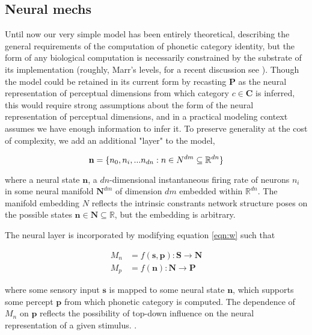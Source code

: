 
\subsection{Neural mechs}

Until now our very simple model has been entirely theoretical, describing the general requirements of the computation of phonetic category identity, but the form of any biological computation is necessarily constrained by the substrate of its implementation (roughly, Marr's levels, for a recent discussion see \cite{rooijTheoryTestHow2020}). Though the model could be retained in its current form by recasting $\mathbf{P}$ as the neural representation of perceptual dimensions from which category $c \in \mathbf{C}$ is inferred, this would require strong assumptions about the form of the neural representation of perceptual dimensions, and in a practical modeling context assumes we have enough information to infer it. To preserve generality at the cost of complexity, we add an additional "layer" to the model, 

\begin{equation}
\mathbf{n} = \{n_0, n_i, ... n_{dn} : n \in \mathbf \mathbf{N}^{dm} \subseteq \mathbb{R}^{dn}\}
\end{equation}

where a neural state $\mathbf{n}$, a $dn$-dimensional instantaneous firing rate of neurons $n_i$ in some neural manifold $\mathbf{N}^{dm}$ of dimension $dm$ embedded within $\mathbb{R}^{dn}$. The manifold embedding $N$ reflects the intrinsic constrants network structure poses on the possible states $\mathbf{n} \in \mathbf{N} \subseteq \mathbb{R}$, but the embedding is arbitrary.

The neural layer is incorporated by modifying equation \ref{eqn:w} such that

\begin{align}
M_n &= f(\mathbf{s}, \mathbf{p}) : \mathbf{S} \rightarrow \mathbf{N}\\
M_p &= f(\mathbf{n}) : \mathbf{N} \rightarrow \mathbf{P}
\end{align}

where some sensory input $\mathbf{s}$ is mapped to some neural state $\mathbf{n}$, which supports some percept $\mathbf{p}$ from which phonetic category is computed. The dependence of $M_n$ on $\mathbf{p}$ reflects the possibility of top-down influence on the neural representation of a given stimulus. . 

